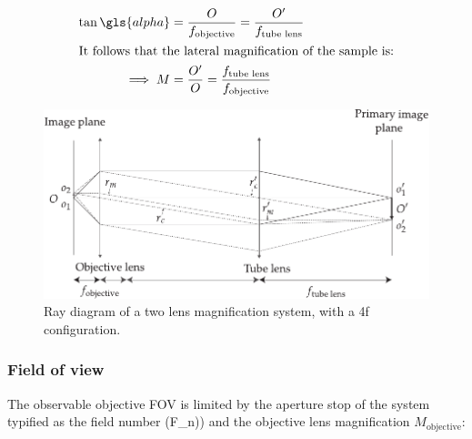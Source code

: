 
\begin{align}
    \tan \gls{alpha} &= \frac{O}{f_{\text{objective}}} =  \frac{O'}{f_{\text{tube lens}}} \\
    \intertext{It follows that the lateral magnification of the sample is:}
    \implies M &= \frac{O'}{O} = \frac{f_{\text{tube lens}}}
{f_{\text{objective}}}
\end{align}

\begin{figure}
    \centering
    \includegraphics{./magnification}
    \caption{Ray diagram of a two lens magnification system, with a \gls{4f} configuration.}
    \label{fig:magnification}
\end{figure}






\subsubsection{Field of view}


The observable objective \gls{FOV} is limited by the aperture stop of the system typified as the field number (\gls{F_n})) and the \gls{objective lens} magnification \(M_{\text{objective}} \):

